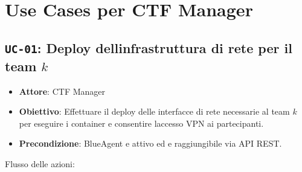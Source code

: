 \section{Use Cases per CTF Manager}\label{use-cases-per-ctf-manager}

\subsection{\texorpdfstring{\texttt{UC-01}: Deploy
dell\textquotesingle infrastruttura di rete per il team
\(k\)}{UC-01: Deploy dell\textquotesingle infrastruttura di rete per il team k}}\label{uc-01-deploy-dellinfrastruttura-di-rete-per-il-team-k}

\begin{itemize}
\tightlist
\item
  \textbf{Attore}: CTF Manager
\item
  \textbf{Obiettivo}: Effettuare il deploy delle interfacce di rete
  necessarie al team \(k\) per eseguire i container e consentire
  l\textquotesingle accesso VPN ai partecipanti.
\item
  \textbf{Precondizione}: BlueAgent e\textquotesingle{} attivo ed
  e\textquotesingle{} raggiungibile via API REST.
\end{itemize}

Flusso delle azioni:

